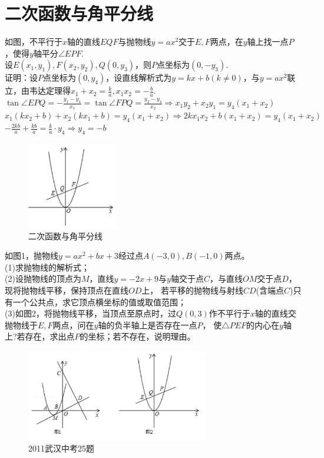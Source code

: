 \documentclass{ecnuthesis}
\begin{document}
\section{二次函数与角平分线}
\begin{model}
    如图，不平行于$x$轴的直线$EQF$与抛物线$y=ax^2$交于$E,F$两点，在$y$轴上找一点$P$，使得$y$轴平分$\angle EPF$. \\
    设$E(x_1,y_1),F(x_2,y_2),Q(0,y_3)$，则$P$点坐标为$(0,-y_3)$. \\
    证明：设$P$点坐标为$(0,y_4)$，设直线解析式为$y=kx+b(k\ne 0)$，与$y=ax^2$联立，由韦达定理得$x_1+x_2=\frac{k}{a},x_1x_2=-\frac{b}{a}$. \\
    $\tan \angle EPQ = -\frac{y_1-y_4}{x_1} = \tan \angle FPQ = \frac{y_2-y_4}{x_2} \Rightarrow x_1y_2+x_2y_1=y_4(x_1+x_2) $ \\
    $x_1(kx_2+b)+x_2(kx_1+b)=y_4(x_1+x_2) \Rightarrow 2kx_1x_2+b(x_1+x_2)=y_4(x_1+x_2)$ \\
    $-\frac{2kb}{a}+\frac{kb}{a}=\frac{k}{a}·y_4 \Rightarrow y_4=-b$
\end{model}
\begin{figure}[H]
\centering
\includegraphics[width=4cm]{picture/1001.png}
\caption{二次函数与角平分线}
\end{figure}
\begin{problem}
    如图1，抛物线$y=ax^2+bx+3$经过点$A(-3,0),B(-1,0)$两点。\\
    (1)求抛物线的解析式；\\
    (2)设抛物线的顶点为$M$，直线$y=-2x+9$与$y$轴交于点$C$，与直线$OM$交于点$D$，现将抛物线平移，保持顶点在直线$OD$上，
    若平移的抛物线与射线$CD$(含端点$C$)只有一个公共点，求它顶点横坐标的值或取值范围；\\
    (3)如图2，将抛物线平移，当顶点至原点时，过$Q(0,3)$作不平行于$x$轴的直线交抛物线于$E,F$两点，问在$y$轴的负半轴上是否存在一点$P$，
    使$\triangle PEF$的内心在$y$轴上?若存在，求出点$P$的坐标；若不存在，说明理由。
\end{problem}
\begin{figure}[H]
\centering
\includegraphics[width=8cm]{picture/1002.png}
\caption{2011武汉中考25题}
\end{figure}
\clearpage
\end{document}

